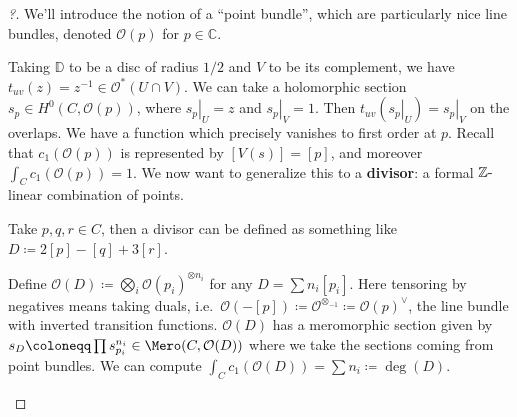 \begin{proof}[?]

We'll introduce the notion of a ``point bundle'', which are particularly
nice line bundles, denoted \({\mathcal{O}}(p)\) for
\(p\in {\mathbb{C}}\).

\begin{figure}
\centering
{}
\end{figure}

Taking \({\mathbb{D}}\) to be a disc of radius \(1/2\) and \(V\) to be
its complement, we have
\(t_{uv}(z) = z^{-1}\in {\mathcal{O}}^*(U \cap V)\). We can take a
holomorphic section \(s_p \in H^0( C, {\mathcal{O}}(p) )\), where
\({ \left.{{s_p}} \right|_{{U}} } = z\) and
\({ \left.{{s_p}} \right|_{{V}} } = 1\). Then
\(t_{uv}( { \left.{{s_p}} \right|_{{U}} } ) = { \left.{{s_p}} \right|_{{V}} }\)
on the overlaps. We have a function which precisely vanishes to first
order at \(p\). Recall that \(c_1( {\mathcal{O}}(p) )\) is represented
by \([ V(s) ] = [p]\), and moreover
\(\int_C c_1 ( {\mathcal{O}}(p) ) = 1\). We now want to generalize this
to a \textbf{divisor}: a formal \({\mathbb{Z}}{\hbox{-}}\)linear
combination of points.

\begin{example}[?]

Take \(p, q,r\in C\), then a divisor can be defined as something like
\(D \coloneqq 2[p] - [q] + 3[r]\).

\end{example}

Define
\({\mathcal{O}}(D) \coloneqq\bigotimes_{i} {\mathcal{O}}(p_i)^{\otimes n_i}\)
for any \(D = \sum n_i [p_i]\). Here tensoring by negatives means taking
duals,
i.e.~\({\mathcal{O}}( -[p] ) \coloneqq{\mathcal{O}}^{\otimes_{-1}} \coloneqq{\mathcal{O}}(p)^\vee\),
the line bundle with inverted transition functions. \({\mathcal{O}}(D)\)
has a meromorphic section given by
\(s_D \coloneqq\prod s_{p_i}^{n_i} \in \Mero(C, {\mathcal{O}}(D) )\)
where we take the sections coming from point bundles. We can compute
\(\int_C c_1 ( {\mathcal{O}}(D) ) = \sum n_i \coloneqq\deg(D)\).

\begin{example}[?]


\end{example}
\end{proof}
